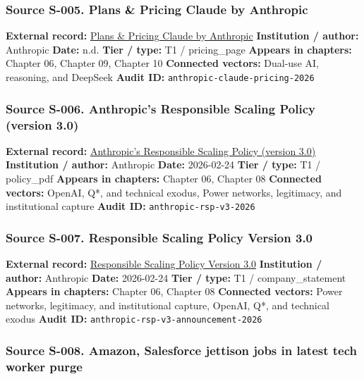 \documentclass[
  american,
  11pt,
  letterpaper,
]{article}
\begin{document}
\subsubsection{Source S-005. Plans \& Pricing \textbar{} Claude by
Anthropic}\label{source-s-005-plans-pricing-claude-by-anthropic}

\textbf{External record:} \href{https://claude.com/pricing}{Plans \&
Pricing \textbar{} Claude by Anthropic} \textbf{Institution / author:}
Anthropic \textbf{Date:} n.d. \textbf{Tier / type:} T1 / pricing\_page
\textbf{Appears in chapters:} Chapter 06, Chapter 09, Chapter 10
\textbf{Connected vectors:} Dual-use AI, reasoning, and DeepSeek
\textbf{Audit ID:} \texttt{anthropic-claude-pricing-2026}

\subsubsection{Source S-006. Anthropic's Responsible Scaling Policy
(version
3.0)}\label{source-s-006-anthropics-responsible-scaling-policy-version-30}

\textbf{External record:}
\href{https://anthropic.com/responsible-scaling-policy/rsp-v3-0}{Anthropic's
Responsible Scaling Policy (version 3.0)} \textbf{Institution / author:}
Anthropic \textbf{Date:} 2026-02-24 \textbf{Tier / type:} T1 /
policy\_pdf \textbf{Appears in chapters:} Chapter 06, Chapter 08
\textbf{Connected vectors:} OpenAI, Q*, and technical exodus, Power
networks, legitimacy, and institutional capture \textbf{Audit ID:}
\texttt{anthropic-rsp-v3-2026}

\subsubsection{Source S-007. Responsible Scaling Policy Version
3.0}\label{source-s-007-responsible-scaling-policy-version-3-0}

\textbf{External record:}
\href{https://www.anthropic.com/news/responsible-scaling-policy-v3}{Responsible
Scaling Policy Version 3.0} \textbf{Institution / author:} Anthropic
\textbf{Date:} 2026-02-24 \textbf{Tier / type:} T1 / company\_statement
\textbf{Appears in chapters:} Chapter 06, Chapter 08 \textbf{Connected
vectors:} Power networks, legitimacy, and institutional capture, OpenAI,
Q*, and technical exodus \textbf{Audit ID:}
\texttt{anthropic-rsp-v3-announcement-2026}

\subsubsection{Source S-008. Amazon, Salesforce jettison jobs in latest
tech worker
purge}\label{source-s-008-amazon-salesforce-jettison-jobs-in-latest-tech-worker-purge}
\end{document}
